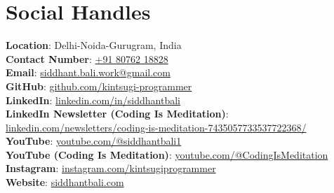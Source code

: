 \documentclass[letterpaper,11pt]{article}
\begin{document}
\section{Social Handles}
 \begin{itemize}[leftmargin=0.15in, label={}]
    \small{\item{
     \textbf{Location}{: Delhi-Noida-Gurugram, India} \\
     \textbf{Contact Number}{: \href{tel:+918076218828}{+91 80762 18828}} \\
     \textbf{Email}{: \href{mailto:siddhant.bali.work@gmail.com}{siddhant.bali.work@gmail.com}} \\
     \textbf{GitHub}{: \href{https://github.com/kintsugi-programmer}{github.com/kintsugi-programmer}} \\
     \textbf{LinkedIn}{: \href{https://www.linkedin.com/in/siddhantbali/}{linkedin.com/in/siddhantbali}} \\
     \textbf{LinkedIn Newsletter (Coding Is Meditation)}{: \href{https://www.linkedin.com/newsletters/coding-is-meditation-7435057733537722368/}{linkedin.com/newsletters/coding-is-meditation-7435057733537722368/}} \\
     \textbf{YouTube}{: \href{https://www.youtube.com/@siddhantbali1}{youtube.com/@siddhantbali1}} \\
     \textbf{YouTube (Coding Is Meditation)}{: \href{https://www.youtube.com/@CodingIsMeditation}{youtube.com/@CodingIsMeditation}} \\
     \textbf{Instagram}{: \href{https://www.instagram.com/kintsugiprogrammer}{instagram.com/kintsugiprogrammer}} \\
     \textbf{Website}{: \href{https://www.siddhantbali.com/}{siddhantbali.com}}
    }
    }
 \end{itemize}

\end{document}
